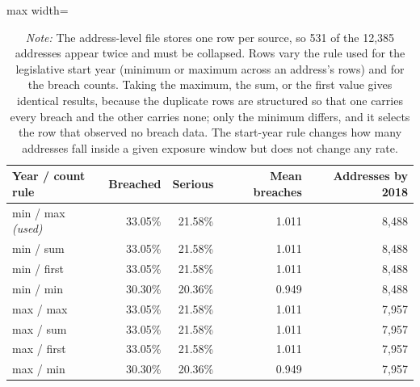 \begin{table}[!htbp]
\centering
\footnotesize
\def\sym#1{\ifmmode^{#1}\else\(^{#1}\)\fi}
\caption{Headline rates under alternative deduplication rules}
\label{tab:sensitivity_dedup}
\begin{adjustbox}{max width=\linewidth}
\begin{tabular}{lrrrr}
\toprule\toprule
Year / count rule & Breached & Serious & Mean breaches & Addresses by 2018 \\
\midrule
min / max \textit{(used)} & 33.05\% & 21.58\% & 1.011 & 8,488 \\
min / sum & 33.05\% & 21.58\% & 1.011 & 8,488 \\
min / first & 33.05\% & 21.58\% & 1.011 & 8,488 \\
min / min & 30.30\% & 20.36\% & 0.949 & 8,488 \\
max / max & 33.05\% & 21.58\% & 1.011 & 7,957 \\
max / sum & 33.05\% & 21.58\% & 1.011 & 7,957 \\
max / first & 33.05\% & 21.58\% & 1.011 & 7,957 \\
max / min & 30.30\% & 20.36\% & 0.949 & 7,957 \\
\bottomrule
\end{tabular}
\end{adjustbox}
\caption*{\scriptsize \emph{Note:} The address-level file stores one row per source, so 531 of the 12,385 addresses appear twice and must be collapsed. Rows vary the rule used for the legislative start year (minimum or maximum across an address's rows) and for the breach counts. Taking the maximum, the sum, or the first value gives identical results, because the duplicate rows are structured so that one carries every breach and the other carries none; only the minimum differs, and it selects the row that observed no breach data. The start-year rule changes how many addresses fall inside a given exposure window but does not change any rate.}
\end{table}
